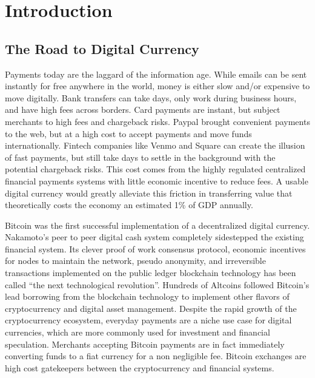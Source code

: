 \documentclass[a4paper,12pt]{article} %
\begin{document}
\pagebreak

\tableofcontents
\newpage

\listoffigures
\pagebreak

\listoftables
\pagebreak

\section{Introduction} \label{sec:1}

\subsection{The Road to Digital Currency} \label{ssec:1.1}
Payments today are the laggard of the information age. While emails can be sent instantly for free anywhere in the world, money is either slow and/or expensive to move digitally. Bank transfers can take days, only work during business hours, and have high fees across borders. Card payments are instant, but subject merchants to high fees and chargeback risks. Paypal brought convenient payments to the web, but at a high cost to accept payments and move funds internationally. Fintech companies like Venmo and Square can create the illusion of fast payments, but still take days to settle in the background with the potential chargeback risks. This cost comes from the highly regulated centralized financial payments systems with little economic incentive to reduce fees. A usable digital currency would greatly alleviate this friction in transferring value that theoretically costs the economy an estimated 1\% of GDP annually\cite{kaarmann2013cost}.

Bitcoin was the first successful implementation of a decentralized digital currency. Nakamoto's peer to peer digital cash system completely sidestepped the existing financial system\cite{nakamoto2008bitcoin}. Its clever proof of work consensus protocol, economic incentives for nodes to maintain the network, pseudo anonymity, and irreversible transactions implemented on the public ledger blockchain technology has been called ``the next technological revolution''\cite{BlockchainRevolution}. Hundreds of Altcoins followed Bitcoin's lead borrowing from the blockchain technology to implement other flavors of cryptocurrency and digital asset management\cite{coinMarketCap}. Despite the rapid growth of the cryptocurrency ecosystem, everyday payments are a niche use case for digital currencies, which are more commonly used for investment and financial speculation\cite{Khairuddin:2016:EMB:2851581.2892500}. Merchants accepting Bitcoin payments are in fact immediately converting funds to a fiat currency for a non negligible fee. Bitcoin exchanges are high cost gatekeepers between the cryptocurrency and financial systems.
\end{document}
